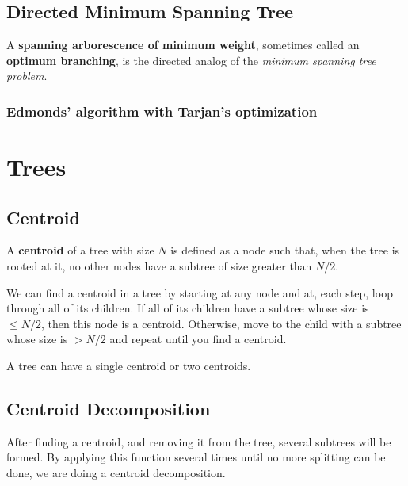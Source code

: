 
\subsection{Directed Minimum Spanning Tree}

	A \textbf{spanning arborescence of minimum weight}, sometimes called an \textbf{optimum branching},
	is the directed analog of the \textit{minimum spanning tree problem}.

	\subsubsection{Edmonds' algorithm with Tarjan's optimization}


\newpage

\section{Trees}


\subsection{Centroid}

A \textbf{centroid} of a tree with size $N$ is defined as a node such that, when the tree is rooted
at it, no other nodes have a subtree of size greater than $N/2$.

We can find a centroid in a tree by starting at any node and at, each step, 
loop through all of its children. 
If all of its children have a subtree whose size is $ \leq N/2$, then this node is a centroid. 
Otherwise, move to the child with a subtree whose size is $> N/2$ 
and repeat until you find a centroid.

A tree can have a single centroid or two centroids.


\vspace{5pt}

\subsection{Centroid Decomposition}

After finding a centroid, and removing it from the tree, several subtrees will be formed.
By applying this function several times until no more splitting can be done,
we are doing a centroid decomposition. 

